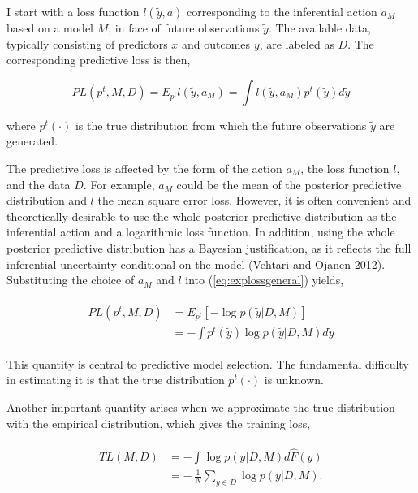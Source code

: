 \documentclass[11pt,article,oneside]{memoir}
\begin{document}
I start with a loss function \(l(\tilde y, a)\) corresponding to the
inferential action \(a_M\) based on a model \(M\), in face of future
observations \(\tilde y\). The available data, typically consisting of
predictors \(x\) and outcomes \(y\), are labeled as \(D\). The
corresponding predictive loss is then,

\begin{equation}
\label{eq:explossgeneral}
PL(p^t, M, D)=E_{p^t}l(\tilde y,
a_M)=\int l(\tilde y, a_M) p^t(\tilde y)d\tilde y
\end{equation}

\noindent where \(p^t(\cdot)\) is the true distribution from which the
future observations \(\tilde y\) are generated.

The predictive loss is affected by the form of the action \(a_M\), the
loss function \(l\), and the data \(D\). For example, \(a_M\) could be
the mean of the posterior predictive distribution and \(l\) the mean
square error loss. However, it is often convenient and theoretically
desirable to use the whole posterior predictive distribution as the
inferential action and a logarithmic loss function. In addition, using
the whole posterior predictive distribution has a Bayesian
justification, as it reflects the full inferential uncertainty
conditional on the model (Vehtari and Ojanen 2012). Substituting the
choice of \(a_M\) and \(l\) into (\ref{eq:explossgeneral}) yields,

\begin{align}
  \begin{split}
  \label{eq:logloss}
  PL(p^t, M, D)&=E_{p^t}[-\log p(\tilde y|D, M)]\\ 
  &=-\int p^t(\tilde y) \log p(\tilde y|D, M) d\tilde y
  \end{split}
  \end{align}

\noindent This quantity is central to predictive model selection. The
fundamental difficulty in estimating it is that the true distribution
\(p^t(\cdot)\) is unknown.

Another important quantity arises when we approximate the true
distribution with the empirical distribution, which gives the training
loss,

\begin{align}
  \begin{split}
  \label{eq:trloss}
  TL(M, D)&=-\int \log p(y|D, M) d\hat{F}(y)\\
  &=-\,\frac{1}{N}\sum_{y\in D}\log p(y | D, M).
  \end{split}
\end{align}
\end{document}
